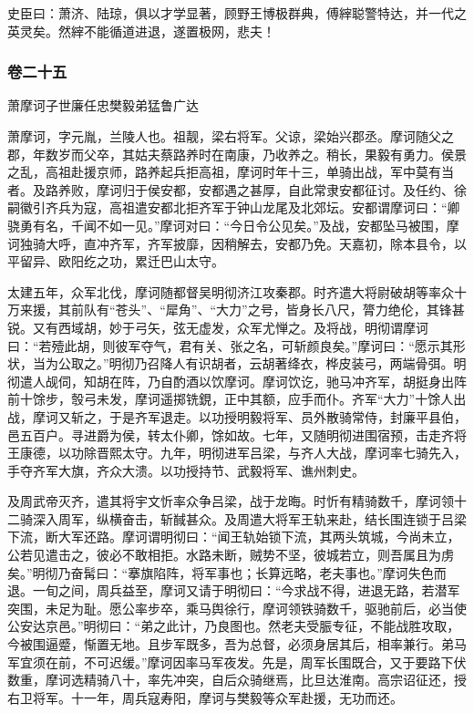 \documentclass[]{article}
\begin{document}
史臣曰：萧济、陆琼，俱以才学显著，顾野王博极群典，傅縡聪警特达，并一代之英灵矣。然縡不能循道进退，遂置极网，悲夫！

\hypertarget{header-n4974}{%
\subsubsection{卷二十五}\label{header-n4974}}

萧摩诃子世廉任忠樊毅弟猛鲁广达

萧摩诃，字元胤，兰陵人也。祖靓，梁右将军。父谅，梁始兴郡丞。摩诃随父之郡，年数岁而父卒，其姑夫蔡路养时在南康，乃收养之。稍长，果毅有勇力。侯景之乱，高祖赴援京师，路养起兵拒高祖，摩诃时年十三，单骑出战，军中莫有当者。及路养败，摩诃归于侯安都，安都遇之甚厚，自此常隶安都征讨。及任约、徐嗣徽引齐兵为寇，高祖遣安都北拒齐军于钟山龙尾及北郊坛。安都谓摩诃曰：``卿骁勇有名，千闻不如一见。''摩诃对曰：``今日令公见矣。''及战，安都坠马被围，摩诃独骑大呼，直冲齐军，齐军披靡，因稍解去，安都乃免。天嘉初，除本县令，以平留异、欧阳纥之功，累迁巴山太守。

太建五年，众军北伐，摩诃随都督吴明彻济江攻秦郡。时齐遣大将尉破胡等率众十万来援，其前队有``苍头''、``犀角''、``大力''之号，皆身长八尺，膂力绝伦，其锋甚锐。又有西域胡，妙于弓矢，弦无虚发，众军尤惮之。及将战，明彻谓摩诃曰：``若殪此胡，则彼军夺气，君有关、张之名，可斩颜良矣。''摩诃曰：``愿示其形状，当为公取之。''明彻乃召降人有识胡者，云胡著绛衣，桦皮装弓，两端骨弭。明彻遣人觇伺，知胡在阵，乃自酌酒以饮摩诃。摩诃饮讫，驰马冲齐军，胡挺身出阵前十馀步，彀弓未发，摩诃遥掷铣鋧，正中其额，应手而仆。齐军``大力''十馀人出战，摩诃又斩之，于是齐军退走。以功授明毅将军、员外散骑常侍，封廉平县伯，邑五百户。寻进爵为侯，转太仆卿，馀如故。七年，又随明彻进围宿预，击走齐将王康德，以功除晋熙太守。九年，明彻进军吕梁，与齐人大战，摩诃率七骑先入，手夺齐军大旗，齐众大溃。以功授持节、武毅将军、谯州刺史。

及周武帝灭齐，遣其将宇文忻率众争吕梁，战于龙晦。时忻有精骑数千，摩诃领十二骑深入周军，纵横奋击，斩馘甚众。及周遣大将军王轨来赴，结长围连锁于吕梁下流，断大军还路。摩诃谓明彻曰：``闻王轨始锁下流，其两头筑城，今尚未立，公若见遣击之，彼必不敢相拒。水路未断，贼势不坚，彼城若立，则吾属且为虏矣。''明彻乃奋髯曰：``搴旗陷阵，将军事也；长算远略，老夫事也。''摩诃失色而退。一旬之间，周兵益至，摩诃又请于明彻曰：``今求战不得，进退无路，若潜军突围，未足为耻。愿公率步卒，乘马舆徐行，摩诃领铁骑数千，驱驰前后，必当使公安达京邑。''明彻曰：``弟之此计，乃良图也。然老夫受脤专征，不能战胜攻取，今被围逼蹙，惭置无地。且步军既多，吾为总督，必须身居其后，相率兼行。弟马军宜须在前，不可迟缓。''摩诃因率马军夜发。先是，周军长围既合，又于要路下伏数重，摩诃选精骑八十，率先冲突，自后众骑继焉，比旦达淮南。高宗诏征还，授右卫将军。十一年，周兵寇寿阳，摩诃与樊毅等众军赴援，无功而还。
\end{document}
